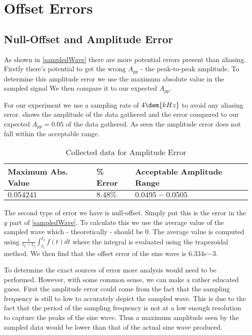 \documentclass[main.tex]{subfile}
\begin{document}
\section{Offset Errors} 
\label{sec:nyquist_frequency}

\subsection{Null-Offset and Amplitude Error}
\label{sec:amplitude_error}

As shown in \eqref{sampledWave} there are more potential errors present than
aliasing. Firstly there's potential to get the wrong $A_{pp}$ - the
peak-to-peak amplitude. To determine this amplitude error we use the maximum
absolute value in the sampled signal We then compare it to our expected
$A_{pp}$. 

For our experiment we use a sampling rate of $4\dem{kHz}$ to avoid any aliasing
error.  shows the amplitude of the data gathered and the error
compared to our expected $A_{pp} = 0.05$ of the data gathered. As seen the
amplitude error does not fall within the acceptable range.

\begin{table}[H]
  \begin{center}
    \caption{Collected data for Amplitude Error}
    \label{tab:ampError}
    \begin{tabular}{lll}
      \\ \toprule
      Maximum Abs. Value & \% Error  & Acceptable Amplitude Range
      \\ \midrule
      $0.054241$ & $8.48\%$ & $0.0495 - 0.0505$
      \\ \bottomrule
    \end{tabular}
  \end{center}
\end{table}

The second type of error we have is null-offset. Simply put this is the error in
the $y$ part of \eqref{sampledWave}. To calculate this we use the average value
of the sampled wave which - theoretically - should be $0$. The average value is
computed using $\frac{1}{t_2-t_1}\int_{t_1}^{t_2}{f(t) dt}$ where the integral
is evaluated using the trapezoidal method. We then find that the offset error of
the sine wave is $6.334e{-3}$.

To determine the exact sources of error more analysis would need to be
performed. However, with some common sense, we can make a rather educated guess.
First the amplitude error could come from the fact that the sampling frequency
is still to low to accurately depict the sampled wave. This is due to the fact
that the period of the sampling frequency is not at a low enough resolution to
capture the peaks of the sine wave. Thus a maximum amplitude seen by the sampled
data would be lower than that of the actual sine wave produced. 
\end{document}
